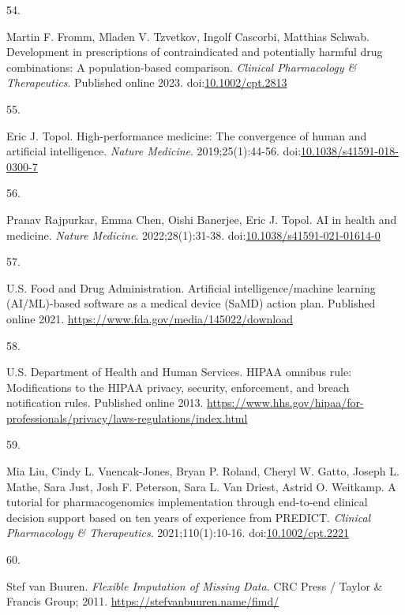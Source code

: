 \documentclass[
  12pt,
]{book}
\newlength{\cslhangindent}
\newlength{\csllabelwidth}
\newenvironment{CSLReferences}[2] %
 {\begin{list}{}{%
  \setlength{\itemindent}{0pt}
  \setlength{\leftmargin}{0pt}
  \setlength{\parsep}{0pt}
  \ifodd #1
   \setlength{\leftmargin}{\cslhangindent}
   \setlength{\itemindent}{-1\cslhangindent}
  \fi
  \setlength{\itemsep}{#2\baselineskip}}}
 {\end{list}}
\newcommand{\CSLLeftMargin}[1]{\parbox[t]{\csllabelwidth}{\strut#1\strut}}
\newcommand{\CSLRightInline}[1]{\parbox[t]{\linewidth - \csllabelwidth}{\strut#1\strut}}
\begin{document}
\begin{CSLReferences}{0}{1}
\CSLLeftMargin{54. }%
\CSLRightInline{Martin F. Fromm, Mladen V. Tzvetkov, Ingolf Cascorbi,
Matthias Schwab. Development in prescriptions of contraindicated and
potentially harmful drug combinations: A population-based comparison.
\emph{Clinical Pharmacology \& Therapeutics}. Published online 2023.
doi:\href{https://doi.org/10.1002/cpt.2813}{10.1002/cpt.2813}}

\CSLLeftMargin{55. }%
\CSLRightInline{Eric J. Topol. High-performance medicine: The
convergence of human and artificial intelligence. \emph{Nature
Medicine}. 2019;25(1):44-56.
doi:\href{https://doi.org/10.1038/s41591-018-0300-7}{10.1038/s41591-018-0300-7}}

\CSLLeftMargin{56. }%
\CSLRightInline{Pranav Rajpurkar, Emma Chen, Oishi Banerjee, Eric J.
Topol. {AI} in health and medicine. \emph{Nature Medicine}.
2022;28(1):31-38.
doi:\href{https://doi.org/10.1038/s41591-021-01614-0}{10.1038/s41591-021-01614-0}}

\CSLLeftMargin{57. }%
\CSLRightInline{U.S. Food and Drug Administration. Artificial
intelligence/machine learning ({AI/ML})-based software as a medical
device ({SaMD}) action plan. Published online 2021.
\url{https://www.fda.gov/media/145022/download}}

\CSLLeftMargin{58. }%
\CSLRightInline{U.S. Department of Health and Human Services. {HIPAA}
omnibus rule: Modifications to the {HIPAA} privacy, security,
enforcement, and breach notification rules. Published online 2013.
\url{https://www.hhs.gov/hipaa/for-professionals/privacy/laws-regulations/index.html}}

\CSLLeftMargin{59. }%
\CSLRightInline{Mia Liu, Cindy L. Vnencak-Jones, Bryan P. Roland, Cheryl
W. Gatto, Joseph L. Mathe, Sara Just, Josh F. Peterson, Sara L. Van
Driest, Astrid O. Weitkamp. A tutorial for pharmacogenomics
implementation through end-to-end clinical decision support based on ten
years of experience from {PREDICT}. \emph{Clinical Pharmacology \&
Therapeutics}. 2021;110(1):10-16.
doi:\href{https://doi.org/10.1002/cpt.2221}{10.1002/cpt.2221}}

\CSLLeftMargin{60. }%
\CSLRightInline{Stef van Buuren. \emph{Flexible Imputation of Missing
Data}. CRC Press / Taylor \& Francis Group; 2011.
\url{https://stefvanbuuren.name/fimd/}}


\end{CSLReferences}
\end{document}
